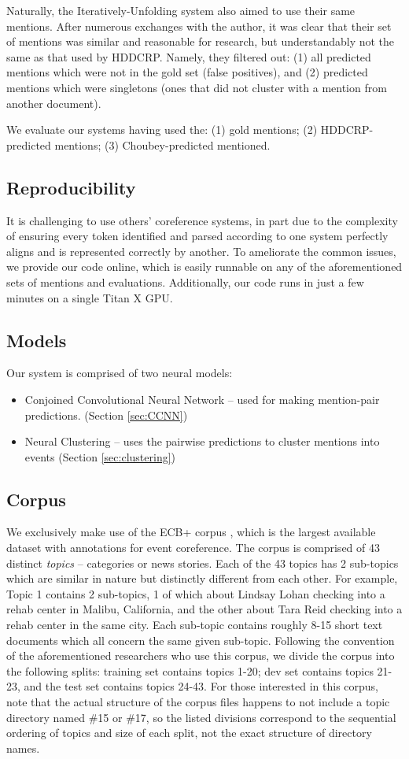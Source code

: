 \documentclass[11pt,a4paper]{article}
\begin{document}
Naturally, the Iteratively-Unfolding system also aimed to use their same mentions.  After numerous exchanges with the author, it was clear that their set of mentions was similar and reasonable for research, but understandably not the same as that used by HDDCRP.  Namely, they filtered out: (1) all predicted mentions which were not in the gold set (false positives), and (2) predicted mentions which were singletons (ones that did not cluster with a mention from another document).

We evaluate our systems having used the: (1) gold mentions; (2) HDDCRP-predicted mentions; (3) Choubey-predicted mentioned.

\subsection{Reproducibility}
It is challenging to use others' coreference systems, in part due to the complexity of ensuring every token identified and parsed according to one system perfectly aligns and is represented correctly by another.  To ameliorate the common issues, we provide our code online, which is easily runnable on any of the aforementioned sets of mentions and evaluations.  Additionally, our code runs in just a few minutes on a single Titan X GPU.
\subsection{Models}
Our system is comprised of two neural models:
\begin{itemize}
  \item Conjoined Convolutional Neural Network -- used for making mention-pair predictions.  (Section \ref{sec:CCNN})
  \item Neural Clustering -- uses the pairwise predictions to cluster mentions into events (Section \ref{sec:clustering})
\end{itemize}
\subsection{Corpus}
\label{sec:corpus}
We exclusively make use of the ECB+ corpus \cite{ECB+}, which is the largest available dataset with annotations for event coreference.  The corpus is comprised of 43 distinct \textit{topics} -- categories or news stories.  Each of the 43 topics has 2 sub-topics which are similar in nature but distinctly different from each other.  For example, Topic 1 contains 2 sub-topics, 1 of which about Lindsay Lohan checking into a rehab center in Malibu, California, and the other about Tara Reid checking into a rehab center in the same city.  Each sub-topic contains roughly 8-15 short text documents which all concern the same given sub-topic.  Following the convention of the aforementioned researchers who use this corpus, we divide the corpus into the following splits: training set contains topics 1-20; dev set contains topics 21-23, and the test set contains topics 24-43.  For those interested in this corpus, note that the actual structure of the corpus files happens to not include a topic directory named \#15 or \#17, so the listed divisions correspond to the sequential ordering of topics and size of each split, not the exact structure of directory names.
\end{document}
